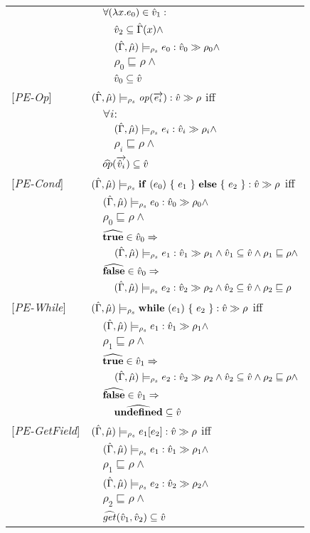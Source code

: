\documentclass[[12pt,a4paper,twoside,openrigh]{report}
\begin{document}
\begin{tabular}{l l l l}
&&\multicolumn{2}{l}{$\forall (\lambda x.e_0) \in \hat{v}_1 :$}\\
&&&$\hat{v}_2 \subseteq \hat{\Gamma}(x) \wedge$\\
&&&$(\hat{\Gamma},\hat{\mu}) \models_{\rho_s} e_0 : \hat{v}_{0} \gg \rho_{0} \wedge$\\ 
&&&$\rho_0 \sqsubseteq \rho \wedge$\\
&&&$\hat{v}_0 \subseteq \hat{v} $\\
{[\textit{PE-Op}]}&\multicolumn{3}{l}{$(\hat{\Gamma},\hat{\mu}) \models_{\rho_s} \mathit{op} (\overrightarrow{e_i}) : \hat{v} \gg \rho $ iff}\\
&&\multicolumn{2}{l}{$\forall i :$}\\
&&&$(\hat{\Gamma},\hat{\mu}) \models_{\rho_s} e_i : \hat{v}_{i} \gg \rho_{i} \wedge $\\
&&&$\rho_i \sqsubseteq \rho \wedge$\\
&&\multicolumn{2}{l}{$\widehat{op} (\overrightarrow{\hat{v}_i}) \subseteq \hat{v} $}\\
{[\textit{PE-Cond}]}&\multicolumn{3}{l}{$(\hat{\Gamma},\hat{\mu}) \models_{\rho_s} \mathbf{if}\ (e_0)\ \{\ e_1\ \}\ \mathbf{else}\ \{\ e_2\ \} : \hat{v} \gg \rho $ iff}\\
&&\multicolumn{2}{l}{$(\hat{\Gamma},\hat{\mu}) \models_{\rho_s} e_0 : \hat{v}_{0} \gg \rho_{0} \wedge$}\\
&&\multicolumn{2}{l}{$\rho_0 \sqsubseteq \rho \wedge$} \\
&&\multicolumn{2}{l}{$\widehat{\mathbf{true}} \in \hat{v}_0 \Rightarrow$}\\
&&&$(\hat{\Gamma},\hat{\mu}) \models_{\rho_s} e_1 : \hat{v}_{1} \gg \rho_{1} \wedge \hat{v}_1 \subseteq \hat{v} \wedge \rho_1 \sqsubseteq \rho \wedge$ \\
&&\multicolumn{2}{l}{$\widehat{\mathbf{false}} \in \hat{v}_0 \Rightarrow$}\\
&&&$(\hat{\Gamma},\hat{\mu}) \models_{\rho_s} e_2 : \hat{v}_{2} \gg \rho_{2} \wedge \hat{v}_2 \subseteq \hat{v} \wedge \rho_2 \sqsubseteq \rho$ \\
{[\textit{PE-While}]}&\multicolumn{3}{l}{$(\hat{\Gamma},\hat{\mu}) \models_{\rho_s} \mathbf{while}\ (e_1)\ \{\ e_2\ \} : \hat{v} \gg \rho $ iff}\\
&&\multicolumn{2}{l}{$(\hat{\Gamma},\hat{\mu}) \models_{\rho_s} e_1 : \hat{v}_{1} \gg \rho_{1} \wedge $}\\
&&\multicolumn{2}{l}{$\rho_1 \sqsubseteq \rho \wedge$} \\
&&\multicolumn{2}{l}{$\widehat{\mathbf{true}} \in \hat{v}_1 \Rightarrow$}\\
&&&$(\hat{\Gamma},\hat{\mu}) \models_{\rho_s} e_2 : \hat{v}_{2} \gg \rho_{2} \wedge \hat{v}_2 \subseteq \hat{v} \wedge \rho_2 \sqsubseteq \rho \wedge$\\
&&\multicolumn{2}{l}{$\widehat{\mathbf{false}} \in \hat{v}_1 \Rightarrow$}\\
&&&$\widehat{\mathbf{undefined}} \subseteq \hat{v}$\\
{[\textit{PE-GetField}]}&\multicolumn{3}{l}{$(\hat{\Gamma},\hat{\mu}) \models_{\rho_s} e_1[e_2] : \hat{v} \gg \rho $ iff}\\
&&\multicolumn{2}{l}{$ (\hat{\Gamma},\hat{\mu}) \models_{\rho_s} e_1 : \hat{v}_{1} \gg \rho_{1} \wedge $}\\
&&\multicolumn{2}{l}{$\rho_1 \sqsubseteq \rho \wedge$} \\
&&\multicolumn{2}{l}{$ (\hat{\Gamma},\hat{\mu}) \models_{\rho_s} e_2 : \hat{v}_{2} \gg \rho_{2} \wedge $} \\
&&\multicolumn{2}{l}{$\rho_2 \sqsubseteq \rho \wedge$} \\
&&\multicolumn{2}{l}{$\widehat{get} (\hat{v}_1, \hat{v}_2) \subseteq \hat{v}$} \\
\end{tabular}\newpage
\end{document}
